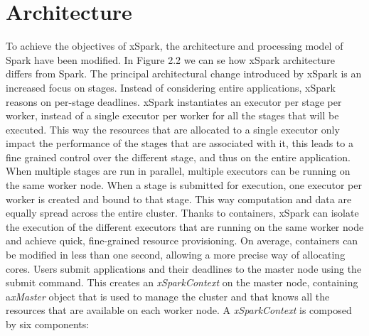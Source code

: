 \section{Architecture}\label{sec:architecture}
To achieve the objectives of xSpark, the architecture and processing
model of Spark have been modified. In Figure 2.2 we can se how
xSpark architecture differs from Spark.
The principal architectural change introduced by xSpark is an increased
focus on stages. Instead of considering entire applications,
xSpark reasons on per-stage deadlines. xSpark instantiates an executor
per stage per worker, instead of a single executor per worker for
all the stages that will be executed. This way the resources that are
allocated to a single executor only impact the performance of the
stages that are associated with it, this leads to a fine grained control
over the different stage, and thus on the entire application. When
multiple stages are run in parallel, multiple executors can be running
on the same worker node. When a stage is submitted for execution,
one executor per worker is created and bound to that stage. This way
computation and data are equally spread across the entire cluster.
Thanks to containers, xSpark can isolate the execution of the different
executors that are running on the same worker node and achieve
quick, fine-grained resource provisioning. On average, containers can
be modified in less than one second, allowing a more precise way of
allocating cores.
Users submit applications and their deadlines to the master node
using the submit command. This creates an \textit{xSparkContext} on the master
node, containing a\textit{xMaster} object that is used to manage the cluster
and that knows all the resources that are available on each worker
node. A \textit{xSparkContext} is composed by six components:
